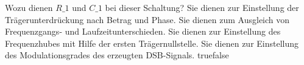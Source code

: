     {Wozu dienen $R\_1$ und $C\_1$ bei dieser Schaltung?  }
    {Sie dienen zur Einstellung der Trägerunterdrückung nach Betrag und Phase.}
    {Sie dienen zum Ausgleich von Frequenzgangs- und Laufzeitunterschieden.}
    {Sie dienen zur Einstellung des Frequenzhubes mit Hilfe der ersten Trägernullstelle.}
    {Sie dienen zur Einstellung des Modulationsgrades des erzeugten DSB-Signals.}
    {true}{false}